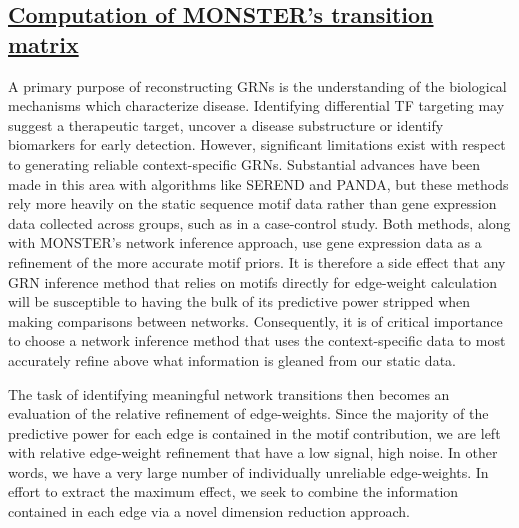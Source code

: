 \documentclass[english]{article}
\begin{document}
\subsection*{\uline{Computation of MONSTER’s transition matrix}}

A primary purpose of reconstructing GRNs is the understanding of the
biological mechanisms which characterize disease. Identifying differential
TF targeting may suggest a therapeutic target, uncover a disease substructure
or identify biomarkers for early detection. However, significant limitations
exist with respect to generating reliable context-specific GRNs. Substantial
advances have been made in this area with algorithms like SEREND and
PANDA, but these methods rely more heavily on the static sequence
motif data rather than gene expression data collected across groups,
such as in a case-control study. Both methods, along with MONSTER's
network inference approach, use gene expression data as a refinement
of the more accurate motif priors. It is therefore a side effect that
any GRN inference method that relies on motifs directly for edge-weight
calculation will be susceptible to having the bulk of its predictive
power stripped when making comparisons between networks. Consequently,
it is of critical importance to choose a network inference method
that uses the context-specific data to most accurately refine above
what information is gleaned from our static data.

The task of identifying meaningful network transitions then becomes
an evaluation of the relative refinement of edge-weights. Since the
majority of the predictive power for each edge is contained in the
motif contribution, we are left with relative edge-weight refinement
that have a low signal, high noise. In other words, we have a very
large number of individually unreliable edge-weights. In effort to
extract the maximum effect, we seek to combine the information contained
in each edge via a novel dimension reduction approach.
\end{document}
